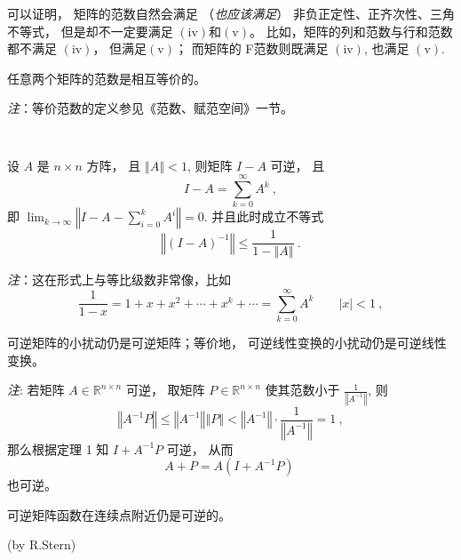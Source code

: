  可以证明， 矩阵的范数自然会满足 （\textsl{也应该满足}） 非负正定性、正齐次性、三角不等式， 但是却不一定要满足 $(\mathrm{iv})$和$(\mathrm{v})$。 比如，矩阵的列和范数与行和范数都不满足 $(\mathrm{iv})$， 但满足$(\mathrm{v})$； 而矩阵的 F范数则既满足 $(\mathrm{iv})$, 也满足 $(\mathrm{v})$. 



\begin{theorem}{}
任意两个矩阵的范数是相互等价的。 

\textsl{注}：等价范数的定义参见《范数、赋范空间》一节。
\end{theorem}
\verb| |

\begin{theorem}{}
设 $A$ 是 $n\times n$ 方阵， 且 $\left\Vert A\right\Vert <1$, 则矩阵 $I-A$
可逆， 且 
\[
I-A=\sum_{k=0}^{\infty}A^{k}~,
\]
即 ${\displaystyle \lim_{k\rightarrow\infty}}\left\Vert I-A-{\displaystyle \sum_{i=0}^{k}A^{i}}\right\Vert =0.$
并且此时成立不等式
\[
\left\Vert (I-A)^{-1}\right\Vert \leqslant{\displaystyle \frac{1}{1-\left\Vert A\right\Vert }~.}
\]
\end{theorem}
\textsl{注}：这在形式上与等比级数非常像，比如
\[
{\displaystyle \frac{1}{1-x}=1+x+x^{2}+\cdots+x^{k}+\cdots=\sum_{k=0}^{\infty}A^{k}\quad\quad|x|<1}~,\]


\begin{corollary}{}
可逆矩阵的小扰动仍是可逆矩阵；等价地， 可逆线性变换的小扰动仍是可逆线性变换。
\end{corollary}

\textsl{注}: 若矩阵 $A\in\mathbb{R}^{n\times n}$ 可逆， 取矩阵 $P\in\mathbb{R}^{n\times n}$
使其范数小于 $\frac{1}{\left\Vert A^{-1}\right\Vert }$, 则
\[
\left\Vert A^{-1}P\right\Vert \leqslant\left\Vert A^{-1}\right\Vert \left\Vert P\right\Vert <\left\Vert A^{-1}\right\Vert \cdot{\displaystyle \frac{1}{\left\Vert A^{-1}\right\Vert }=1~,}
\]
那么根据定理 1 知 $I+A^{-1}P$ 可逆， 从而
\[
A+P=A(I+A^{-1}P)~
\]
也可逆。 

\begin{corollary}{}
可逆矩阵函数在连续点附近仍是可逆的。
\end{corollary} 

(by R.Stern)